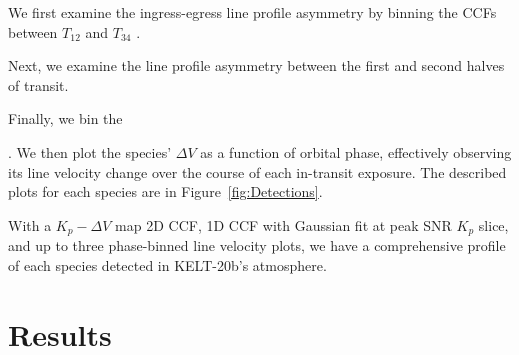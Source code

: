 \documentclass[twocolumn]{aastex631}
\begin{document}
            We first examine the ingress-egress line profile asymmetry by binning the CCFs between $T_{12}$ and $T_{34}$ \citep{Lund2017}. 

            Next, we examine the line profile asymmetry between the first and second halves of transit.

            Finally, we bin the 
            
            
            
            . We then plot the species' $\Delta V$ as a function of orbital phase, effectively observing its line velocity change over the course of each in-transit exposure. The described plots for each species are in Figure~\ref{fig:Detections}. 

            With a ${K_p-\Delta V}$ map 2D CCF, 1D CCF with Gaussian fit at peak SNR $K_p$ slice, and up to three phase-binned line velocity plots, we have a comprehensive profile of each species detected in KELT-20b's atmosphere. 

    
            
            
    \section{Results}\label{sec:Results}
\end{document}
